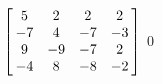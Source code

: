 {$\left[\hskip -3pt \begin{array}{cccc} 5&2&2&2\\  -7&4&-7&-3
\\  9&-9&-7&2\\  -4&8&-8&-2
\end{array}\hskip -3pt \right]$} 
{$0$}



  

